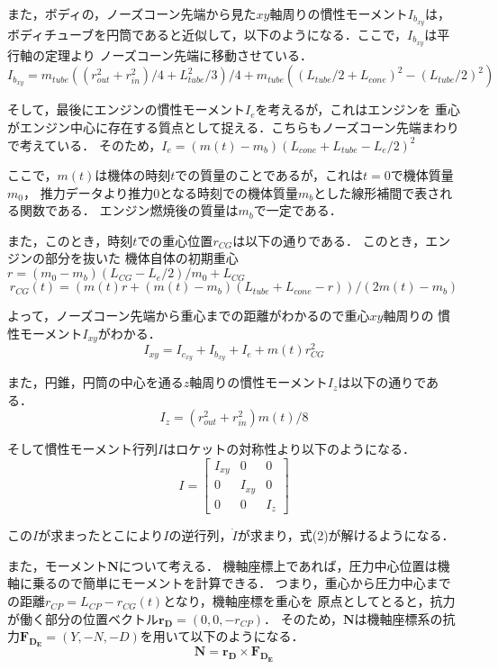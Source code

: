 \documentclass{jsarticle}
\begin{document}
また，ボディの，ノーズコーン先端から見た$xy$軸周りの慣性モーメント$I_b_{xy}$は，
ボディチューブを円筒であると近似して，以下のようになる．ここで，$I_b_{xy}$は平行軸の定理より
ノーズコーン先端に移動させている．
\begin{equation}
  I_b_{xy} = m_{tube}((r_{out}^2 + r_{in}^2)/ 4 + L_{tube}^2/ 3) / 4
  + m_{tube}((L_{tube} / 2 + L_{cone})^2 - (L_{tube} / 2)^2)
\end{equation}

そして，最後にエンジンの慣性モーメント$I_e$を考えるが，これはエンジンを
重心がエンジン中心に存在する質点として捉える．こちらもノーズコーン先端まわり
で考えている．
そのため，$I_e = (m(t) - m_b)(L_{cone} + L_{tube} - L_e / 2)^2$

ここで，$m(t)$は機体の時刻$t$での質量のことであるが，これは$t=0$で機体質量$m_0$，
推力データより推力0となる時刻での機体質量$m_b$とした線形補間で表される関数である．
エンジン燃焼後の質量は$m_b$で一定である．

また，このとき，時刻$t$での重心位置$r_{CG}$は以下の通りである．
このとき，エンジンの部分を抜いた
機体自体の初期重心$r= (m_0 - m_b)(L_{CG} - L_e / 2) / m_0 + L_{CG}$
\begin{equation}
  r_{CG}(t)=(m(t)r+ (m(t) - m_b)(L_{tube} + L_{cone} - r)) / (2m(t) - m_b)
\end{equation}

よって，ノーズコーン先端から重心までの距離がわかるので重心$xy$軸周りの
慣性モーメント$I_{xy}$がわかる．
\begin{equation}
  I_{xy} = I_c_{xy} + I_b_{xy} + I_e + m(t)r_{CG}^2
\end{equation}

また，円錐，円筒の中心を通る$z$軸周りの慣性モーメント$I_z$は以下の通りである．
\begin{equation}
  I_z = (r_{out}^2 + r_{in}^2)m(t) / 8
\end{equation}

そして慣性モーメント行列$I$はロケットの対称性より以下のようになる．
\begin{equation}
  I =
  \begin{bmatrix}
    I_{xy} & 0 & 0 \\
    0 & I_{xy} & 0 \\
    0 & 0 & I_{z}
  \end{bmatrix}
\end{equation}

この$I$が求まったとこにより$I$の逆行列，$\dot{I}$が求まり，式(2)が解けるようになる．

また，モーメント$\bm{N}$について考える．
機軸座標上であれば，圧力中心位置は機軸に乗るので簡単にモーメントを計算できる．
つまり，重心から圧力中心までの距離$r_{CP} = L_{CP} - r_{CG}(t)$となり，機軸座標を重心を
原点としてとると，抗力が働く部分の位置ベクトル$\bm{r_D} = (0, 0, -r_{CP})$．
そのため，$\bm{N}$は機軸座標系の抗力$\bm{F_D_E} = (Y, -N, -D)$を用いて以下のようになる．
\begin{equation}
  \bm{N} = \bm{r_D} \times \bm{F_D_E}
\end{equation}
\end{document}
